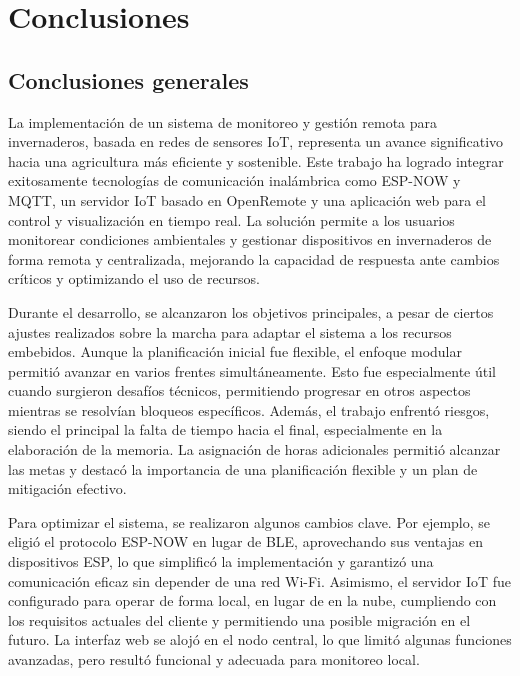 
\chapter{Conclusiones} %

\label{Chapter5} %




\section{Conclusiones generales }

La implementación de un sistema de monitoreo y gestión remota para invernaderos, basada en redes de sensores IoT, representa un avance significativo hacia una agricultura más eficiente y sostenible. Este trabajo ha logrado integrar exitosamente tecnologías de comunicación inalámbrica como ESP-NOW y MQTT, un servidor IoT basado en OpenRemote y una aplicación web para el control y visualización en tiempo real. La solución permite a los usuarios monitorear condiciones ambientales y gestionar dispositivos en invernaderos de forma remota y centralizada, mejorando la capacidad de respuesta ante cambios críticos y optimizando el uso de recursos.

Durante el desarrollo, se alcanzaron los objetivos principales, a pesar de ciertos ajustes realizados sobre la marcha para adaptar el sistema a los recursos embebidos. Aunque la planificación inicial fue flexible, el enfoque modular permitió avanzar en varios frentes simultáneamente. Esto fue especialmente útil cuando surgieron desafíos técnicos, permitiendo progresar en otros aspectos mientras se resolvían bloqueos específicos. Además, el trabajo enfrentó riesgos, siendo el principal la falta de tiempo hacia el final, especialmente en la elaboración de la memoria. La asignación de horas adicionales permitió alcanzar las metas y destacó la importancia de una planificación flexible y un plan de mitigación efectivo.

Para optimizar el sistema, se realizaron algunos cambios clave. Por ejemplo, se eligió el protocolo ESP-NOW en lugar de BLE, aprovechando sus ventajas en dispositivos ESP, lo que simplificó la implementación y garantizó una comunicación eficaz sin depender de una red Wi-Fi. Asimismo, el servidor IoT fue configurado para operar de forma local, en lugar de en la nube, cumpliendo con los requisitos actuales del cliente y permitiendo una posible migración en el futuro. La interfaz web se alojó en el nodo central, lo que limitó algunas funciones avanzadas, pero resultó funcional y adecuada para monitoreo local.

